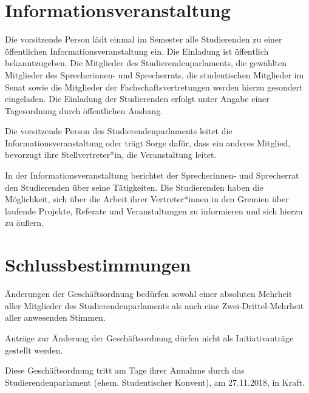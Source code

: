 \documentclass[10pt,a4paper]{scrartcl}
\begin{document}
\section{Informationsveranstaltung}\label{informationsveranstaltung}

\begin{contract}

\label{einladung-zur-informationsveranstaltung}

Die vorsitzende Person lädt einmal im Semester alle Studierenden zu
einer öffentlichen Informationsveranstaltung ein. Die Einladung ist
öffentlich bekanntzugeben. Die Mitglieder des Studierendenparlaments,
die gewählten Mitglieder des Sprecherinnen- und Sprecherrats, die
studentischen Mitglieder im Senat sowie die Mitglieder der
Fachschaftsvertretungen werden hierzu gesondert eingeladen. Die
Einladung der Studierenden erfolgt unter Angabe einer Tagesordnung durch
öffentlichen Aushang.


\label{ablauf-der-informationsveranstaltung}




  Die vorsitzende Person des Studierendenparlaments leitet die
  Informationsveranstaltung oder trägt Sorge dafür, dass ein anderes
  Mitglied, bevorzugt ihre Stellvertreter*in, die Veranstaltung leitet.

  In der Informationsveranstaltung berichtet der Sprecherinnen- und
  Sprecherrat den Studierenden über seine Tätigkeiten. Die Studierenden
  haben die Möglichkeit, sich über die Arbeit ihrer Vertreter*innen in
  den Gremien über laufende Projekte, Referate und Veranstaltungen zu
  informieren und sich hierzu zu äußern.


\end{contract}


\section{Schlussbestimmungen}\label{schlussbestimmungen}

\begin{contract}


\label{uxe4nderungen}

Änderungen der Geschäftsordnung bedürfen sowohl einer absoluten
Mehrheit aller Mitglieder des Studierendenparlaments als auch eine
Zwei-Drittel-Mehrheit aller anwesenden Stimmen.

Anträge zur Änderung der Geschäftsordnung dürfen nicht als
Initiativanträge gestellt werden.


\label{inkrafttreten}

Diese Geschäftsordnung tritt am Tage ihrer Annahme durch das
Studierendenparlament (ehem. Studentischer Konvent), am 27.11.2018, in Kraft.

\end{contract}
\end{document}
